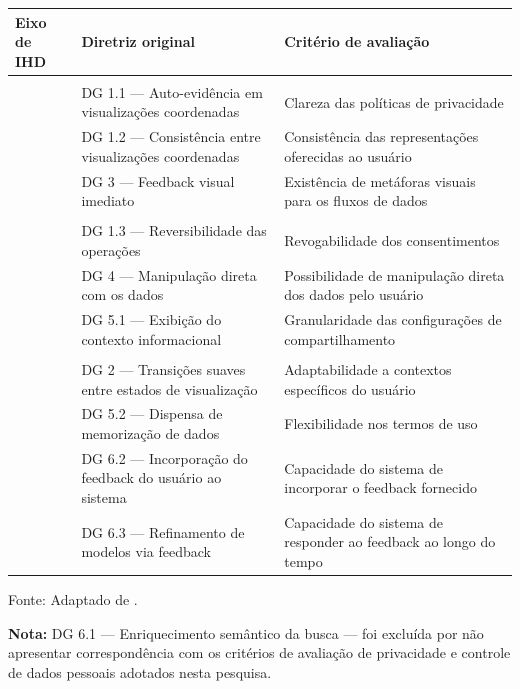 \documentclass[
	12pt,				%
	oneside,			%
	a4paper,			%
	english,			%
	brazil				%
	]{abntex2ppgsi}
\begin{document}
\begin{quadro}[h]
    \centering
    \caption{Diretrizes de design de IHD adaptadas aos eixos de avaliação}
    \label{tab:diretrizes-ihd}
    \renewcommand{\arraystretch}{1.4}
    \small
    \begin{tabular}{p{2.2cm}p{4.5cm}p{4.8cm}}
        \hline
        \textbf{Eixo de IHD} & \textbf{Diretriz original} & 
        \textbf{Critério de avaliação} \\
        \hline
        \rowcolor{white}
        \multicolumn{3}{l}{\textit{Legibilidade}} \\
            & DG 1.1 --- Auto-evidência em visualizações coordenadas
            & Clareza das políticas de privacidade \\
            & DG 1.2 --- Consistência entre visualizações coordenadas
            & Consistência das representações oferecidas ao usuário \\
            & DG 3 --- Feedback visual imediato
            & Existência de metáforas visuais para os fluxos de dados \\
        \hline
        \rowcolor{white}
        \multicolumn{3}{l}{\textit{Agência}} \\
            & DG 1.3 --- Reversibilidade das operações
            & Revogabilidade dos consentimentos \\
            & DG 4 --- Manipulação direta com os dados
            & Possibilidade de manipulação direta dos dados pelo usuário \\
            & DG 5.1 --- Exibição do contexto informacional
            & Granularidade das configurações de compartilhamento \\
        \hline
        \rowcolor{white}
        \multicolumn{3}{l}{\textit{Negociabilidade}} \\
            & DG 2 --- Transições suaves entre estados de visualização
            & Adaptabilidade a contextos específicos do usuário \\
            & DG 5.2 --- Dispensa de memorização de dados
            & Flexibilidade nos termos de uso \\
            & DG 6.2 --- Incorporação do feedback do usuário ao sistema
            & Capacidade do sistema de incorporar o feedback fornecido \\
            & DG 6.3 --- Refinamento de modelos via feedback
            & Capacidade do sistema de responder ao feedback ao longo 
            do tempo \\
        \hline
    \end{tabular}

    \vspace{0.2cm}
    {\small Fonte: Adaptado de .}

    \vspace{0.1cm}
    {\small \textbf{Nota:} DG 6.1 --- Enriquecimento semântico da 
    busca --- foi excluída por não apresentar correspondência com os 
    critérios de avaliação de privacidade e controle de dados pessoais 
    adotados nesta pesquisa.}
\end{quadro}
\end{document}
